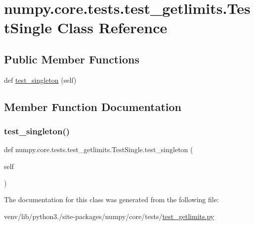 \hypertarget{classnumpy_1_1core_1_1tests_1_1test__getlimits_1_1TestSingle}{}\section{numpy.\+core.\+tests.\+test\+\_\+getlimits.\+Test\+Single Class Reference}
\label{classnumpy_1_1core_1_1tests_1_1test__getlimits_1_1TestSingle}
\subsection*{Public Member Functions}
\begin{DoxyCompactItemize}
\item 
def \hyperlink{classnumpy_1_1core_1_1tests_1_1test__getlimits_1_1TestSingle_a699c0728e57cf760bc33e8da10dda79c}{test\+\_\+singleton} (self)
\end{DoxyCompactItemize}


\subsection{Member Function Documentation}
\mbox{\label{classnumpy_1_1core_1_1tests_1_1test__getlimits_1_1TestSingle_a699c0728e57cf760bc33e8da10dda79c}} 
\subsubsection{\texorpdfstring{test\+\_\+singleton()}{test\_singleton()}}
{\footnotesize\ttfamily def numpy.\+core.\+tests.\+test\+\_\+getlimits.\+Test\+Single.\+test\+\_\+singleton (\begin{DoxyParamCaption}\item[{}]{self }\end{DoxyParamCaption})}



The documentation for this class was generated from the following file\+:\begin{DoxyCompactItemize}
\item 
venv/lib/python3./site-\/packages/numpy/core/tests/\hyperlink{test__getlimits_8py}{test\+\_\+getlimits.\+py}\end{DoxyCompactItemize}
